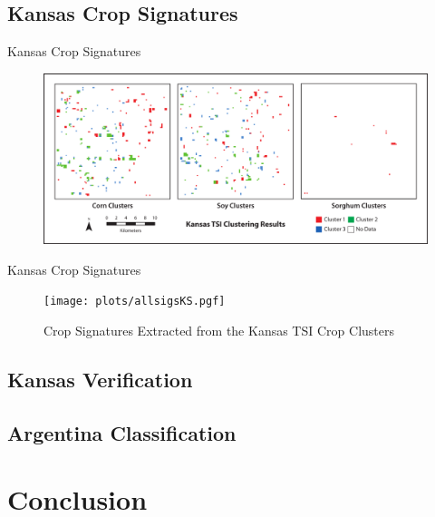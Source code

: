 \documentclass[draft,compress]{beamer}
\begin{document}
\subsection{Kansas Crop Signatures}
\begin{frame}{Kansas Crop Signatures}
\begin{figure}
  \centering
  \includegraphics[width=\textwidth]{Graphics/KSclustered.pdf}
\end{figure}
\end{frame}

\begin{frame}{Kansas Crop Signatures}
\begin{figure}
  \centering
  \texttt{[image: plots/allsigsKS.pgf]}
  \caption{Crop Signatures Extracted from the Kansas TSI Crop Clusters}
\end{figure}

\end{frame}


\subsection{Kansas Verification}

\subsection{Argentina Classification}


\section{Conclusion}
\end{document}
